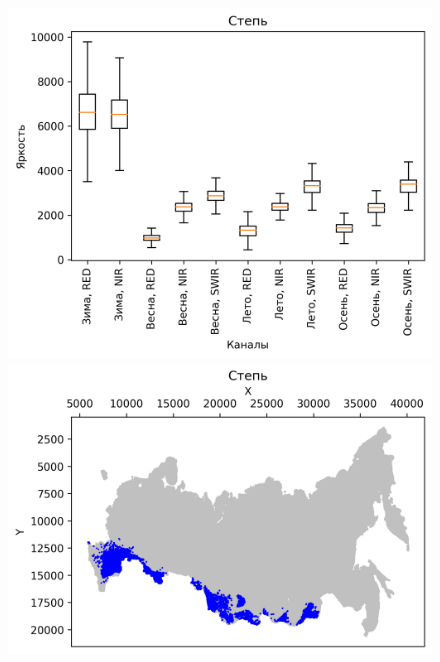 \documentclass[14pt, a4paper, oneside]{extarticle}
\begin{document}
\begin{figure}[H]
    \centering
    \includegraphics[]{class-14-boxplot}
    \includegraphics[]{class-14-map}
\end{figure}
\end{document}
